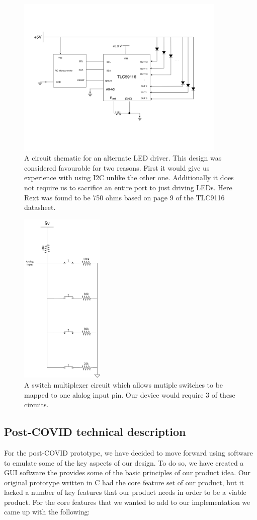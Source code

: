 \documentclass[11pt]{article}
\begin{document}
\begin{figure}[htbp]
\centering
\includegraphics[width=10cm]{./led_driver_newpng.png}
\caption{\label{fig:orgeb2729d}
A circuit shematic for an alternate LED driver. This design was considered favourable for two reasons. First it would give us experience with using I2C unlike the other one. Additionally it does not require us to sacrifice an entire port to just driving LEDs. Here Rext was found to be 750 ohms based on page 9 of the TLC9116 datasheet.}
\end{figure}

\begin{figure}[htbp]
\centering
\includegraphics[width=4cm]{./switch_circuit.png}
\caption{\label{fig:org66f1cec}
A switch multiplexer circuit which allows mutiple switches to be mapped to one alalog input pin. Our device would require 3 of these circuits.}
\end{figure}

\newpage 
\subsection{Post-COVID technical description}
\label{sec:org6791b4e}
   For the post-COVID prototype, we have decided to move forward using
software to emulate some of the key aspects of our design. To do so,
we have created a GUI software the provides some of the basic
principles of our product idea. Our original prototype written in C
had the core feature set of our product, but it lacked a number of key
features that our product needs in order to be a viable product.  For
the core features that we wanted to add to our implementation we came
up with the following:
\end{document}
